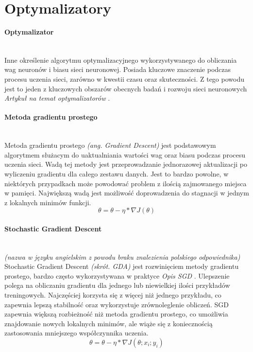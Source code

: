 \section{Optymalizatory}
\paragraph{Optymalizator} \mbox{}\\
Inne określenie algorytmu optymalizacyjnego wykorzystywanego do obliczania wag neuronów
i biasu sieci neuronowej. Posiada kluczowe znaczenie podczas procesu uczenia sieci,
zarówno w kwestii czasu oraz skuteczności. Z tego powodu jest to jeden z kluczowych
obszarów obecnych badań i rozwoju sieci neuronowych \textit{Artykuł na temat optymalizatorów} \cite{typesOfOptimizationAlgorithms}.

\paragraph{Metoda gradientu prostego} \mbox{}\\
Metoda gradientu prostego \textit{(ang. Gradient Descent)} jest podstawowym algorytmem
służacym do uaktualniania wartości wag oraz biasu podczas procesu uczenia sieci. Wadą tej
metody jest przeprowadzanie jednorazowej aktualizacji po wyliczeniu gradientu dla
całego zestawu danych. Jest to bardzo powolne, w niektórych przypadkach może powodować
problem z ilością zajmowanego miejsca w pamięci. Największą wadą jest możliwość doprowadzenia
do stagnacji w jednym z lokalnych minimów funkcji.
\begin{equation}
\theta = \theta - \eta * \nabla J(\theta)
\end{equation}

\paragraph{Stochastic Gradient Descent} \mbox{}\\
\textit{(nazwa w języku angielskim z powodu braku znalezienia polskiego odpowiednika)}
Stochastic Gradient Descent \textit{(skrót. GDA)} jest rozwinięciem metody gradientu
prostego, bardzo często wykorzystywana w praktyce \textit{Opis SGD} \cite{OptimizersOverview}.
Ulepszenie polega na obliczaniu gradientu dla jednego lub niewielkiej ilości przykładów
treningowych. Najczęściej korzysta się z więcej niż jednego przykładu, co zapewnia
lepszą stabilność oraz wykorzystuje zrównoleglenie obliczeń. SGD zapewnia większą rozbieżność
niż metoda gradientu prostego, co umożliwia znajdowanie nowych lokalnych minimów, ale
wiąże się z koniecznością zastosowania mniejszego współczynnika uczenia.
\begin{equation}
\theta = \theta - \eta * \nabla J(\theta; x_i; y_i)
\end{equation}


